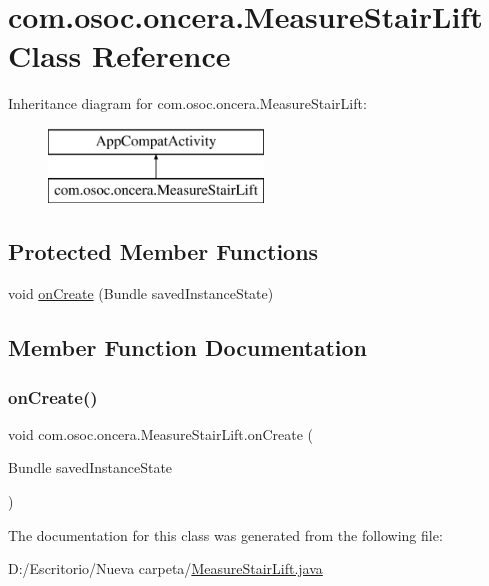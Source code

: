 \hypertarget{classcom_1_1osoc_1_1oncera_1_1_measure_stair_lift}{}\section{com.\+osoc.\+oncera.\+Measure\+Stair\+Lift Class Reference}
\label{classcom_1_1osoc_1_1oncera_1_1_measure_stair_lift}
Inheritance diagram for com.\+osoc.\+oncera.\+Measure\+Stair\+Lift\+:\begin{figure}[H]
\begin{center}
\leavevmode
\includegraphics[height=2.000000cm]{classcom_1_1osoc_1_1oncera_1_1_measure_stair_lift}
\end{center}
\end{figure}
\subsection*{Protected Member Functions}
\begin{DoxyCompactItemize}
\item 
void \mbox{\hyperlink{classcom_1_1osoc_1_1oncera_1_1_measure_stair_lift_a2dd58b1661e9c1edd8ed2122543831bd}{on\+Create}} (Bundle saved\+Instance\+State)
\end{DoxyCompactItemize}


\subsection{Member Function Documentation}
\mbox{\label{classcom_1_1osoc_1_1oncera_1_1_measure_stair_lift_a2dd58b1661e9c1edd8ed2122543831bd}} 
\subsubsection{\texorpdfstring{onCreate()}{onCreate()}}
{\footnotesize\ttfamily void com.\+osoc.\+oncera.\+Measure\+Stair\+Lift.\+on\+Create (\begin{DoxyParamCaption}\item[{Bundle}]{saved\+Instance\+State }\end{DoxyParamCaption})\hspace{0.3cm}{\ttfamily [protected]}}



The documentation for this class was generated from the following file\+:\begin{DoxyCompactItemize}
\item 
D\+:/\+Escritorio/\+Nueva carpeta/\mbox{\hyperlink{_measure_stair_lift_8java}{Measure\+Stair\+Lift.\+java}}\end{DoxyCompactItemize}
